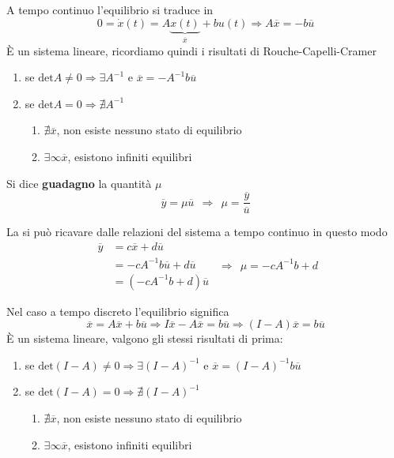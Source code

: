 \documentclass[10pt,a4paper]{book}
\begin{document}
A tempo continuo l'equilibrio si traduce in
\begin{equation*}
0=\dot{x} (t)=A\underbrace{x(t)}_{\overline{x}} +bu(t)\Rightarrow A\overline{x} =-b\overline{u}
\end{equation*}
È un sistema lineare, ricordiamo quindi i risultati di Rouche-Capelli-Cramer
\begin{enumerate}
\item se $\mathrm{det} A\neq 0\Rightarrow \exists A^{-1}$ e $\boxed{\overline{x} =-A^{-1} b\overline{u}}$
\item se $\mathrm{det} A=0\Rightarrow \nexists A^{-1}$
\begin{enumerate}
\item $\nexists \overline{x}$, non esiste nessuno stato di equilibrio
\item $\exists \infty \overline{x}$, esistono infiniti equilibri
\end{enumerate}
\end{enumerate}
\begin{definition}
Si dice \textbf{guadagno} la quantità $\mu $
\begin{equation*}
\overline{y} =\mu \overline{u} \ \ \Rightarrow \ \ \boxed{\mu =\frac{\overline{y}}{\overline{u}}}
\end{equation*}
\end{definition}
La si può ricavare dalle relazioni del sistema a tempo continuo in questo modo
\begin{equation*}
\begin{aligned}
\overline{y} & =c\overline{x} +d\overline{u}\\
 & =-cA^{-1} b\overline{u} +d\overline{u}\\
 & =\left( -cA^{-1} b+d\right)\overline{u}
\end{aligned} \ \ \Rightarrow \ \ \boxed{\mu =-cA^{-1} b+d}
\end{equation*}

Nel caso a tempo discreto l'equilibrio significa
\begin{equation*}
\overline{x} =A\overline{x} +b\overline{u} \Rightarrow I\overline{x} -A\overline{x} =b\overline{u} \Rightarrow ( I-A)\overline{x} =b\overline{u}
\end{equation*}
È un sistema lineare, valgono gli stessi risultati di prima:
\begin{enumerate}
\item se $\mathrm{det}( I-A) \neq 0\Rightarrow \exists ( I-A)^{-1}$ e $\boxed{\overline{x} =( I-A)^{-1} b\overline{u}}$
\item se $\mathrm{det}( I-A) =0\Rightarrow \nexists ( I-A)^{-1}$
\begin{enumerate}
\item $\nexists \overline{x}$, non esiste nessuno stato di equilibrio
\item $\exists \infty \overline{x}$, esistono infiniti equilibri
\end{enumerate}
\end{enumerate}
\end{document}
